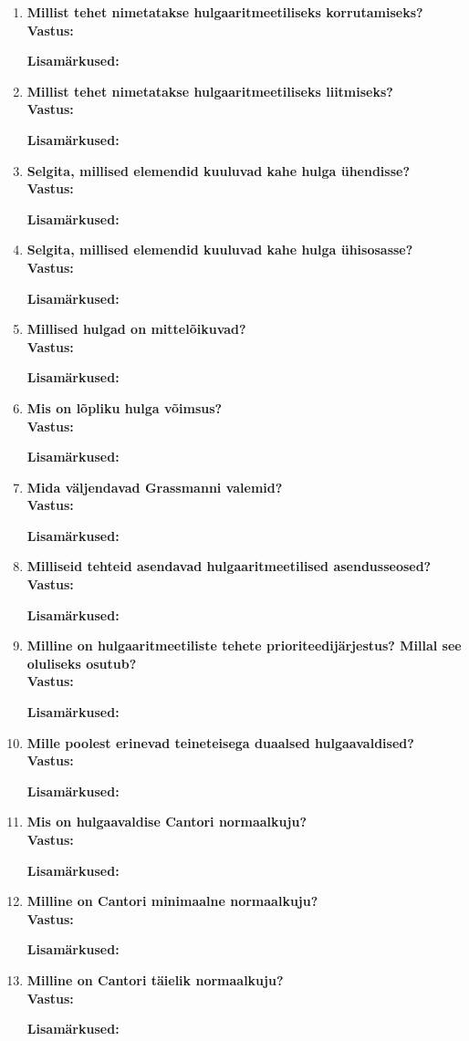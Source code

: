 \documentclass[a4paper,12pt]{article}
\makeatletter
\newenvironment{question}[1]{%
  \item \textbf{#1} \vspace{0.5em} \\ %
  \textbf{Vastus:} \vspace{0.25em} \\ %
  \def\@lisamarkused{} %
}{%
  \if\relax\detokenize\expandafter{\@lisamarkused}\relax %
  \else
    \vspace{0.5em} %
    \textbf{Lisamärkused:} \\ %
    \@lisamarkused %
  \fi
  \vspace{1em} %
}
\makeatother
\begin{document}
\begin{enumerate}[left=0pt]
\begin{question}{Millist tehet nimetatakse hulgaaritmeetiliseks korrutamiseks?}
\end{question}

\begin{question}{Millist tehet nimetatakse hulgaaritmeetiliseks liitmiseks?}
\end{question}

\begin{question}{Selgita, millised elemendid kuuluvad kahe hulga ühendisse?}
\end{question}

\begin{question}{Selgita, millised elemendid kuuluvad kahe hulga ühisosasse?}
\end{question}

\begin{question}{Millised hulgad on mittelõikuvad?}
\end{question}

\begin{question}{Mis on lõpliku hulga võimsus?}
\end{question}

\begin{question}{Mida väljendavad Grassmanni valemid?}
\end{question}

\begin{question}{Milliseid tehteid asendavad hulgaaritmeetilised asendusseosed?}
\end{question}

\begin{question}{Milline on hulgaaritmeetiliste tehete prioriteedijärjestus? Millal see oluliseks osutub?}
\end{question}

\begin{question}{Mille poolest erinevad teineteisega duaalsed hulgaavaldised?}
\end{question}

\begin{question}{Mis on hulgaavaldise Cantori normaalkuju?}
\end{question}

\begin{question}{Milline on Cantori minimaalne normaalkuju?}
\end{question}

\begin{question}{Milline on Cantori täielik normaalkuju?}
\end{question}


\end{enumerate}
\end{document}
